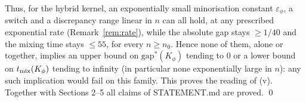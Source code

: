 \documentclass[11pt]{article}
\theoremstyle{remark}
\newcommand{\eps}{\varepsilon}
\newcommand{\gs}{\mathrm{gap}^*}
\begin{document}
Thus, for the hybrid kernel, an exponentially small minorisation constant $\eps_\phi$, a switch and a discrepancy range linear in $n$ can all hold, at any prescribed exponential rate (Remark~\ref{rem:rate}), while the absolute gap stays $\ge1/40$ and the mixing time stays $\le55$, for every $n\ge n_0$. Hence none of them, alone or together, implies an upper bound on $\gs(K_\phi)$ tending to $0$ or a lower bound on $t_{\rm mix}(K_\phi)$ tending to infinity (in particular none exponentially large in $n$): any such implication would fail on this family. This proves the reading of (v). Together with Sections 2--5 all claims of STATEMENT.md are proved. \qed
\end{document}
